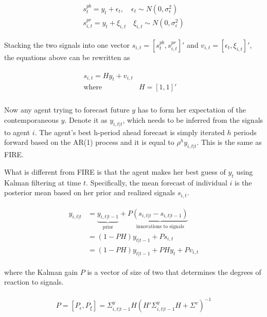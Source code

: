 \documentclass[12pt]{article}
\begin{document}
	\begin{eqnarray}\label{NISigDef}
		\begin{aligned}
			s^{pb}_t = y_t + \epsilon_t, \quad \epsilon_t \sim N(0,\sigma^2_\epsilon)\\ 
			s^{pr}_{i,t} = y_t + \xi_{i,t} \quad \xi_{i,t} \sim N(0,\sigma^2_\epsilon)
		\end{aligned}
	\end{eqnarray}
	
	Stacking the two signals into one vector $s_{i,t} = [s^{pb}_t,s^{pr}_{i,t}]'$ and $v_{i,t}= [\epsilon_t,\xi_{i,t}]'$, the equations above can be rewritten as 
	
	\begin{eqnarray}
		\begin{aligned}
			s_{i,t} = H y_{t} + v_{i,t} \\
			\text{where } & H=[1,1]' \quad \\
		\end{aligned}
	\end{eqnarray}
	
	
	Now any agent trying to forecast future $y$ has to form her expectation of the contemporaneous $y$. Denote it as  $y_{i,t|t}$, which needs to be inferred from the signals to agent $i$. The agent's best h-period ahead forecast is simply iterated $h$ periods forward based on the AR(1) process and it is equal to $\rho^h y_{i,t|t}$. This is the same as FIRE.
	
	What is different from FIRE is that the agent makes her best guess of $y_t$ using Kalman filtering at time $t$. Specifically, the mean forecast of individual $i$ is the posterior mean based on her prior and realized signals $s_{i,t}$. 
	
	
	\begin{eqnarray}
		\begin{aligned}
			y_{i,t|t}  
			& =  \underbrace{y_{i,t|t-1}}_{\text{prior}} + P \underbrace {(s_{i,t|t}-s_{i,t|t-1})}_{\text{innovations to signals}} \\
			& = (1-PH) y_{t|t-1} + Ps_{i,t} \\
			& = (1-PH) y_{t|t-1} + PH y_{t} + P v_{i,t} 
		\end{aligned}
	\end{eqnarray}
	
	where the Kalman gain $P$ is a vector of size of two that determines the degrees of reaction to signals. 
	
	
	\begin{eqnarray}
		\begin{aligned}
			P = [P_\epsilon,P_\xi]= \Sigma^y_{i,t|t-1} H(H'\Sigma^y_{i,t|t-1} H + \Sigma^v)^{-1} 
		\end{aligned}
	\end{eqnarray}
	
\end{document}
